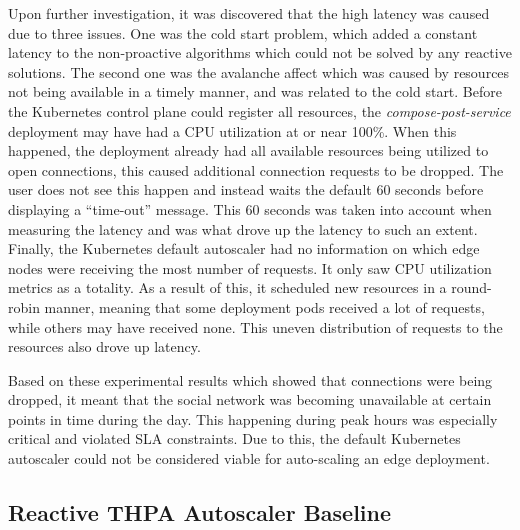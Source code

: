 Upon further investigation, it was discovered that the high latency was caused due to three issues. One was the cold start problem, which added a constant latency to the non-proactive algorithms which could not be solved by any reactive solutions. The second one was the avalanche affect which was caused by resources not being available in a timely manner, and was related to the cold start. Before the Kubernetes control plane could register all resources, the \textit{compose-post-service} deployment may have had a CPU utilization at or near 100\%. When this happened, the deployment already had all available resources being utilized to open connections, this caused additional connection requests to be dropped. The user does not see this happen and instead waits the default 60 seconds before displaying a ``time-out'' message. This 60 seconds was taken into account when measuring the latency and was what drove up the latency to such an extent. Finally, the Kubernetes default autoscaler had no information on which edge nodes were receiving the most number of requests. It only saw CPU utilization metrics as a totality. As a result of this, it scheduled new resources in a round-robin manner, meaning that some deployment pods received a lot of requests, while others may have received none. This uneven distribution of requests to the resources also drove up latency.\par

Based on these experimental results which showed that connections were being dropped, it meant that the social network was becoming unavailable at certain points in time during the day. This happening during peak hours was especially critical and violated SLA constraints. Due to this, the default Kubernetes autoscaler could not be considered viable for auto-scaling an edge deployment.

\subsection {Reactive THPA Autoscaler Baseline}
\label{subsec:ch6-reactive-algo}

